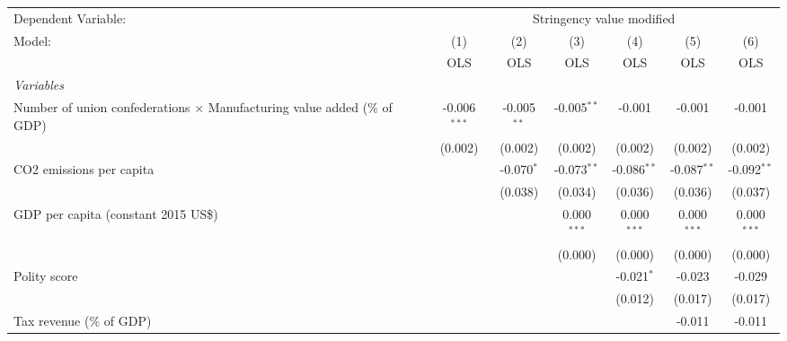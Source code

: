 
\begingroup
\centering
\begin{tabular}{lcccccc}
   \toprule
   Dependent Variable: & \multicolumn{6}{c}{Stringency value modified}\\
   Model:                                                                          & (1)            & (2)           & (3)           & (4)           & (5)           & (6)\\  
                                                                                   &  OLS           & OLS           & OLS           & OLS           & OLS           & OLS\\  
   \midrule
   \emph{Variables}\\
   Number of union confederations $\times$ Manufacturing value added (\% of GDP)   & -0.006$^{***}$ & -0.005$^{**}$ & -0.005$^{**}$ & -0.001        & -0.001        & -0.001\\   
                                                                                   & (0.002)        & (0.002)       & (0.002)       & (0.002)       & (0.002)       & (0.002)\\   
   CO2 emissions per capita                                                        &                & -0.070$^{*}$  & -0.073$^{**}$ & -0.086$^{**}$ & -0.087$^{**}$ & -0.092$^{**}$\\   
                                                                                   &                & (0.038)       & (0.034)       & (0.036)       & (0.036)       & (0.037)\\   
   GDP per capita (constant 2015 US\$)                                             &                &               & 0.000$^{***}$ & 0.000$^{***}$ & 0.000$^{***}$ & 0.000$^{***}$\\   
                                                                                   &                &               & (0.000)       & (0.000)       & (0.000)       & (0.000)\\   
   Polity score                                                                    &                &               &               & -0.021$^{*}$  & -0.023        & -0.029\\   
                                                                                   &                &               &               & (0.012)       & (0.017)       & (0.017)\\   
   Tax revenue (\% of GDP)                                                         &                &               &               &               & -0.011        & -0.011\\   

\end{tabular}
